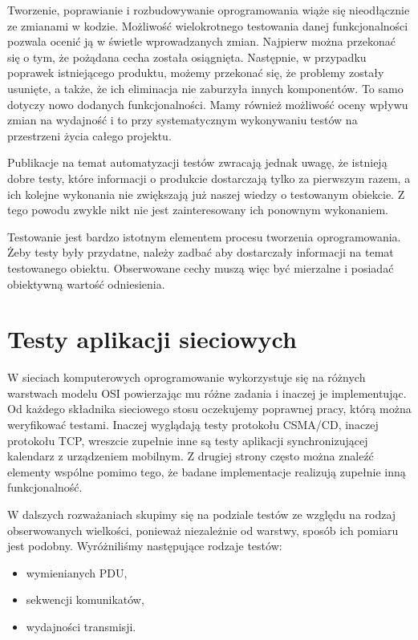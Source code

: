 \documentclass[00-praca-magisterska.tex]{subfiles}
\begin{document}
Tworzenie, poprawianie i rozbudowywanie oprogramowania wiąże się nieodłącznie
ze zmianami w kodzie. Możliwość wielokrotnego testowania danej funkcjonalności
pozwala ocenić ją w świetle wprowadzanych zmian. Najpierw można przekonać się o
tym, że pożądana cecha została osiągnięta. Następnie, w przypadku poprawek
istniejącego produktu, możemy przekonać się, że problemy zostały usunięte, a
także, że ich eliminacja nie zaburzyła innych komponentów. To samo dotyczy nowo
dodanych funkcjonalności. Mamy również możliwość oceny wpływu zmian na
wydajność i to przy systematycznym wykonywaniu testów na przestrzeni życia
całego projektu.

Publikacje na temat automatyzacji testów \cite{good-test,snake-oil} zwracają
jednak uwagę, że istnieją dobre testy, które informacji o produkcie dostarczają
tylko za pierwszym razem, a ich kolejne wykonania nie zwiększają już naszej
wiedzy o testowanym obiekcie. Z tego powodu zwykle nikt nie jest zainteresowany
ich ponownym wykonaniem.

Testowanie jest bardzo istotnym elementem procesu tworzenia oprogramowania.
Żeby testy były przydatne, należy zadbać aby dostarczały informacji na temat
testowanego obiektu. Obserwowane cechy muszą więc być mierzalne i posiadać
obiektywną wartość odniesienia.

\section{Testy aplikacji sieciowych}
\label{testy-aplikacji-sieciowych}

W sieciach komputerowych oprogramowanie wykorzystuje się na różnych warstwach
modelu OSI powierzając mu różne zadania i inaczej je implementując. Od każdego
składnika sieciowego stosu oczekujemy poprawnej pracy, którą można weryfikować
testami. Inaczej wyglądają testy protokołu CSMA/CD, inaczej protokołu TCP,
wreszcie zupełnie inne są testy aplikacji synchronizującej kalendarz z
urządzeniem mobilnym. Z drugiej strony często można znaleźć elementy wspólne
pomimo tego, że badane implementacje realizują zupełnie inną funkcjonalność.

W dalszych rozważaniach skupimy się na podziale testów ze względu na rodzaj
obserwowanych wielkości, ponieważ niezależnie od warstwy, sposób ich pomiaru
jest podobny. Wyróżniliśmy następujące rodzaje testów:
\begin{itemize}
  \item wymienianych PDU,
  \item sekwencji komunikatów,
  \item wydajności transmisji.
\end{itemize}
\end{document}
